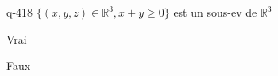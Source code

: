 \begin{truefalse}{q-418}
$\{ (x,y,z) \in \mathbb R^3, x+y\geq 0\}$ est un sous-ev de $\mathbb R^3$
\item Vrai
\item* Faux
\end{truefalse}

